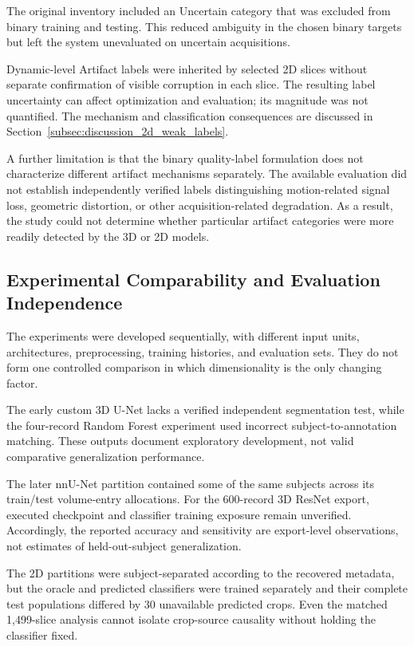 The original inventory included an Uncertain category that was excluded from binary training and testing. This reduced ambiguity in the chosen binary targets but left the system unevaluated on uncertain acquisitions.

Dynamic-level Artifact labels were inherited by selected 2D slices without separate confirmation of visible corruption in each slice. The resulting label uncertainty can affect optimization and evaluation; its magnitude was not quantified. The mechanism and classification consequences are discussed in Section~\ref{subsec:discussion_2d_weak_labels}.

A further limitation is that the binary quality-label formulation does not characterize different artifact mechanisms separately. The available evaluation did not establish independently verified labels distinguishing motion-related signal loss, geometric distortion, or other acquisition-related degradation. As a result, the study could not determine whether particular artifact categories were more readily detected by the 3D or 2D models.

\subsection{Experimental Comparability and Evaluation Independence}

The experiments were developed sequentially, with different input units, architectures, preprocessing, training histories, and evaluation sets. They do not form one controlled comparison in which dimensionality is the only changing factor.

The early custom 3D U-Net lacks a verified independent segmentation test, while the four-record Random Forest experiment used incorrect subject-to-annotation matching. These outputs document exploratory development, not valid comparative generalization performance.

The later nnU-Net partition contained some of the same subjects across its train/test volume-entry allocations. For the 600-record 3D ResNet export, executed checkpoint and classifier training exposure remain unverified. Accordingly, the reported accuracy and sensitivity are export-level observations, not estimates of held-out-subject generalization.

The 2D partitions were subject-separated according to the recovered metadata, but the oracle and predicted classifiers were trained separately and their complete test populations differed by 30 unavailable predicted crops. Even the matched 1,499-slice analysis cannot isolate crop-source causality without holding the classifier fixed.

